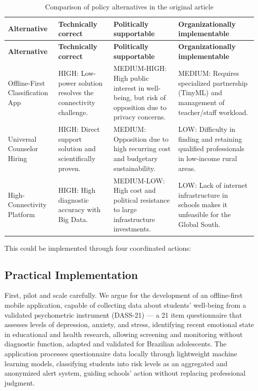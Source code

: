 \documentclass[
  12pt,
  openright,
  oneside,
  a4paper,
  english,
  brazil
]{abntex2}
\begin{document}
\begin{longtable}{p{3.0cm}p{3.3cm}p{3.3cm}p{3.3cm}}
\caption{Comparison of policy alternatives in the original article}\label{tab:comparison-original}\\
\toprule
\textbf{Alternative} & \textbf{Technically correct} & \textbf{Politically supportable} & \textbf{Organizationally implementable} \\
\midrule
\endfirsthead
\toprule
\textbf{Alternative} & \textbf{Technically correct} & \textbf{Politically supportable} & \textbf{Organizationally implementable} \\
\midrule
\endhead
Offline-First Classification App
& HIGH: Low-power solution resolves the connectivity challenge.
& MEDIUM-HIGH: High public interest in well-being, but risk of opposition due to privacy concerns.
& MEDIUM: Requires specialized partnership (TinyML) and management of teacher/staff workload. \\
\addlinespace
Universal Counselor Hiring
& HIGH: Direct support solution and scientifically proven.
& MEDIUM: Opposition due to high recurring cost and budgetary sustainability.
& LOW: Difficulty in finding and retaining qualified professionals in low-income rural areas. \\
\addlinespace
High-Connectivity Platform
& HIGH: High diagnostic accuracy with Big Data.
& MEDIUM-LOW: High cost and political resistance to large infrastructure investments.
& LOW: Lack of internet infrastructure in schools makes it unfeasible for the Global South. \\
\bottomrule
\end{longtable}

This could be implemented through four coordinated actions:

\subsection{Practical Implementation}

First, pilot and scale carefully. We argue for the development of an
offline-first mobile application, capable of collecting data about students'
well-being from a validated psychometric instrument (DASS-21) --- a 21 item
questionnaire that assesses levels of depression, anxiety, and stress,
identifying recent emotional state in educational and health research, allowing
screening and monitoring without diagnostic function, adapted and validated for
Brazilian adolescents. The application processes questionnaire data locally
through lightweight machine learning models, classifying students into risk
levels as an aggregated and anonymized alert system, guiding schools' action
without replacing professional judgment.
\end{document}
